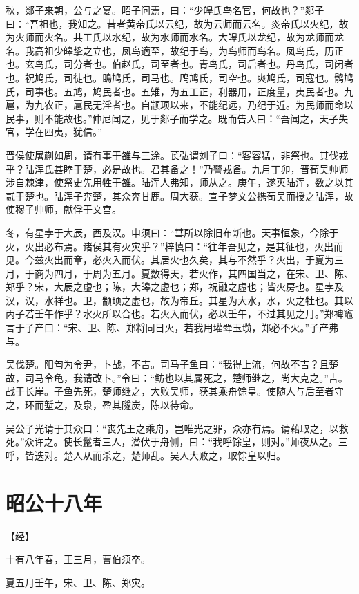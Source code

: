 \documentclass[a4paper,12pt,UTF8,twoside]{ctexbook}
\begin{document}
秋，郯子来朝，公与之宴。昭子问焉，曰：“少皞氏鸟名官，何故也？”郯子曰：“吾祖也，我知之。昔者黄帝氏以云纪，故为云师而云名。炎帝氏以火纪，故为火师而火名。共工氏以水纪，故为水师而水名。大皞氏以龙纪，故为龙师而龙名。我高祖少皞挚之立也，凤鸟適至，故纪于鸟，为鸟师而鸟名。凤鸟氏，历正也。玄鸟氏，司分者也。伯赵氏，司至者也。青鸟氏，司启者也。丹鸟氏，司闭者也。祝鸠氏，司徒也。鴡鸠氏，司马也。鸤鸠氏，司空也。爽鸠氏，司寇也。鹘鸠氏，司事也。五鸠，鸠民者也。五雉，为五工正，利器用，正度量，夷民者也。九扈，为九农正，扈民无淫者也。自颛顼以来，不能纪远，乃纪于近。为民师而命以民事，则不能故也。”仲尼闻之，见于郯子而学之。既而告人曰：“吾闻之，天子失官，学在四夷，犹信。”

晋侯使屠蒯如周，请有事于雒与三涂。苌弘谓刘子曰：“客容猛，非祭也。其伐戎乎？陆浑氏甚睦于楚，必是故也。君其备之！”乃警戎备。九月丁卯，晋荀吴帅师涉自棘津，使祭史先用牲于雒。陆浑人弗知，师从之。庚午，遂灭陆浑，数之以其贰于楚也。陆浑子奔楚，其众奔甘鹿。周大获。宣子梦文公携荀吴而授之陆浑，故使穆子帅师，献俘于文宫。

冬，有星孛于大辰，西及汉。申须曰：“彗所以除旧布新也。天事恒象，今除于火，火出必布焉。诸侯其有火灾乎？”梓慎曰：“往年吾见之，是其征也，火出而见。今兹火出而章，必火入而伏。其居火也久矣，其与不然乎？火出，于夏为三月，于商为四月，于周为五月。夏数得天，若火作，其四国当之，在宋、卫、陈、郑乎？宋，大辰之虚也；陈，大皞之虚也；郑，祝融之虚也；皆火房也。星孛及汉，汉，水祥也。卫，颛顼之虚也，故为帝丘。其星为大水，水，火之牡也。其以丙子若壬午作乎？水火所以合也。若火入而伏，必以壬午，不过其见之月。”郑裨竈言于子产曰：“宋、卫、陈、郑将同日火，若我用瓘斝玉瓒，郑必不火。”子产弗与。

吴伐楚。阳匄为令尹，卜战，不吉。司马子鱼曰：“我得上流，何故不吉？且楚故，司马令龟，我请改卜。”令曰：“鲂也以其属死之，楚师继之，尚大克之。”吉。战于长岸。子鱼先死，楚师继之，大败吴师，获其乘舟馀皇。使随人与后至者守之，环而堑之，及泉，盈其隧炭，陈以待命。

吴公子光请于其众曰：“丧先王之乘舟，岂唯光之罪，众亦有焉。请藉取之，以救死。”众许之。使长鬣者三人，潜伏于舟侧，曰：“我呼馀皇，则对。”师夜从之。三呼，皆迭对。楚人从而杀之，楚师乱。吴人大败之，取馀皇以归。


\chapter{昭公十八年}



【经】

十有八年春，王三月，曹伯须卒。

夏五月壬午，宋、卫、陈、郑灾。
\end{document}

